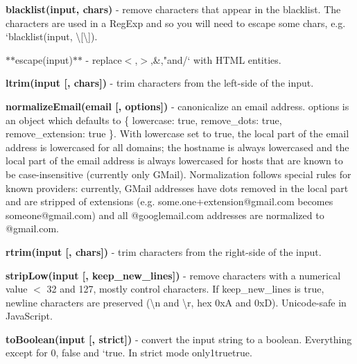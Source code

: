 \begin{DoxyItemize}
\item {\bfseries blacklist(input, chars)} -\/ remove characters that appear in the blacklist. The characters are used in a Reg\+Exp and so you will need to escape some chars, e.\+g. `blacklist(input, \textquotesingle{}\textbackslash{}\mbox{[}\textbackslash{}\mbox{]}\textquotesingle{}){\ttfamily .}
\item {\ttfamily $\ast$$\ast$escape(input)$\ast$$\ast$ -\/ replace}$<${\ttfamily ,}$>${\ttfamily ,}\&{\ttfamily ,}\textquotesingle{}{\ttfamily ,}"{\ttfamily and}/` with H\+T\+ML entities.
\item {\bfseries ltrim(input \mbox{[}, chars\mbox{]})} -\/ trim characters from the left-\/side of the input.
\item {\bfseries normalize\+Email(email \mbox{[}, options\mbox{]})} -\/ canonicalize an email address. {\ttfamily options} is an object which defaults to {\ttfamily \{ lowercase\+: true, remove\+\_\+dots\+: true, remove\+\_\+extension\+: true \}}. With {\ttfamily lowercase} set to {\ttfamily true}, the local part of the email address is lowercased for all domains; the hostname is always lowercased and the local part of the email address is always lowercased for hosts that are known to be case-\/insensitive (currently only G\+Mail). Normalization follows special rules for known providers\+: currently, G\+Mail addresses have dots removed in the local part and are stripped of extensions (e.\+g. {\ttfamily some.\+one+extension@gmail.\+com} becomes {\ttfamily someone@gmail.\+com}) and all {\ttfamily @googlemail.\+com} addresses are normalized to {\ttfamily @gmail.\+com}.
\item {\bfseries rtrim(input \mbox{[}, chars\mbox{]})} -\/ trim characters from the right-\/side of the input.
\item {\bfseries strip\+Low(input \mbox{[}, keep\+\_\+new\+\_\+lines\mbox{]})} -\/ remove characters with a numerical value $<$ 32 and 127, mostly control characters. If {\ttfamily keep\+\_\+new\+\_\+lines} is {\ttfamily true}, newline characters are preserved ({\ttfamily \textbackslash{}n} and {\ttfamily \textbackslash{}r}, hex {\ttfamily 0xA} and {\ttfamily 0xD}). Unicode-\/safe in Java\+Script.
\item {\bfseries to\+Boolean(input \mbox{[}, strict\mbox{]})} -\/ convert the input string to a boolean. Everything except for {\ttfamily \textquotesingle{}0\textquotesingle{}}, {\ttfamily \textquotesingle{}false\textquotesingle{}} and `\textquotesingle{}true{\ttfamily . In strict mode only}\textquotesingle{}1\textquotesingle{}truetrue{\ttfamily .}

\end{DoxyItemize}
